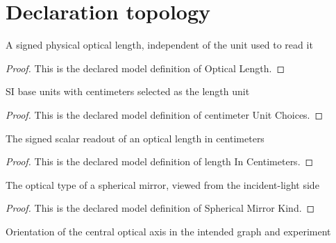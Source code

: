 \section{Declaration topology}
\begin{definition}
  \label{def:physics:phyx-mini-0442:phyxminiproblems-problemphyxmini0442-opticallength}
  A signed physical optical length, independent of the unit used to read it
\end{definition}
\begin{proof}
  This is the declared model definition of Optical Length.
\end{proof}
\begin{definition}
  \label{def:physics:phyx-mini-0442:phyxminiproblems-problemphyxmini0442-centimeterunitchoices}
  SI base units with centimeters selected as the length unit
\end{definition}
\begin{proof}
  This is the declared model definition of centimeter Unit Choices.
\end{proof}
\begin{definition}
  \label{def:physics:phyx-mini-0442:phyxminiproblems-problemphyxmini0442-lengthincentimeters}
  The signed scalar readout of an optical length in centimeters
\end{definition}
\begin{proof}
  This is the declared model definition of length In Centimeters.
\end{proof}
\begin{definition}
  \label{def:physics:phyx-mini-0442:phyxminiproblems-problemphyxmini0442-sphericalmirrorkind}
  The optical type of a spherical mirror, viewed from the incident-light side
\end{definition}
\begin{proof}
  This is the declared model definition of Spherical Mirror Kind.
\end{proof}
\begin{definition}
  \label{def:physics:phyx-mini-0442:phyxminiproblems-problemphyxmini0442-principalaxisorientation}
  Orientation of the central optical axis in the intended graph and experiment
\end{definition}
